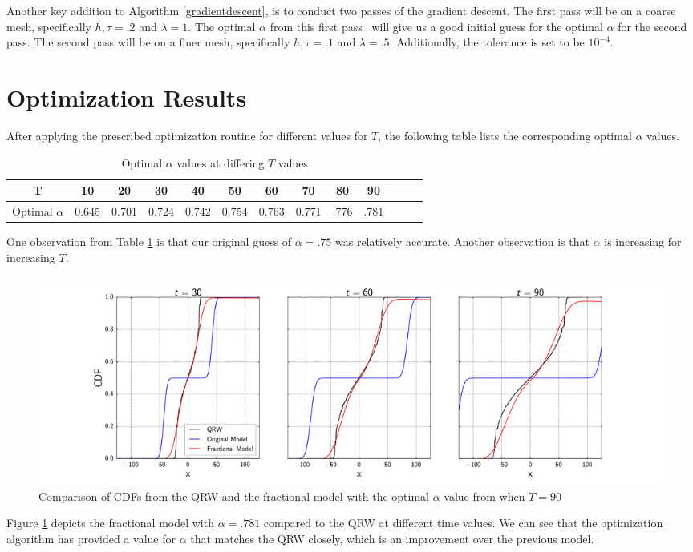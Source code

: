 \documentclass{siamart1116}
\newcommand{\LB}[1]{{\color{blue}~\textsf{#1}}}
\begin{document}
Another key addition to Algorithm \ref{gradientdescent}, is to conduct two passes of the gradient descent. The first pass will be on a coarse mesh, specifically $h,\tau=.2$ and $\lambda=1$. The optimal $\alpha$ from this first pass \LB{will give us a good initial guess for the optimal $\alpha$ for the second pass. The second pass} will be on a finer mesh, specifically $h,\tau=.1$ and $\lambda=.5$. Additionally, the tolerance is set to be $10^{-4}$. 

\section{Optimization Results} \label{s:Optimization Results}
After applying the prescribed optimization routine for different values for $T$, the following table lists the corresponding optimal $\alpha$ values.
\begin{table}[h!]
\centering
\begin{tabular}{ |c | c | c | c | c |c |c |c |c |c |c |c |c}
\hline
T 			   & 10 	& 20 		& 30 		& 40 		& 50 		& 60 		& 70 	 	& 80		& 90 \\\hline
Optimal $\alpha$ & 0.645 & 0.701 	& 0.724 	& 0.742 	& 0.754 	& 0.763	& 0.771 	& .776	& .781 \\\hline
\end{tabular}
\caption {Optimal $\alpha$ values at differing $T$ values}
\label{optimizationresults}
\end{table}

One observation from Table \ref{optimizationresults} is that our original guess of $\alpha=.75$ was relatively accurate. Another observation is that $\alpha$ is increasing for increasing $T$. 
\begin{figure}[h!]
\centering
\includegraphics[clip, trim=6.5cm .5cm 6.5cm 1.50cm, width=1.00\textwidth]{opt5_90results}
\caption{Comparison of CDFs from the QRW and the fractional model with the optimal $\alpha$ value from when $T=90$}
\label{resultsT90}
\end{figure}
Figure \ref{resultsT90} depicts the fractional model with $\alpha=.781$ compared to the QRW at different time values. We can see that the optimization algorithm has provided a value for $\alpha$ that matches the QRW closely, which is an improvement over the previous model.
\end{document}
